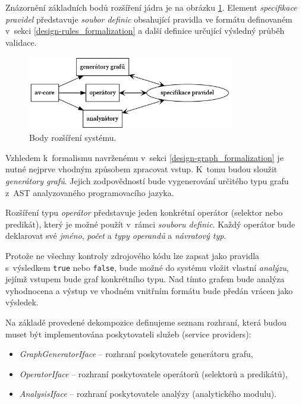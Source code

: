 Znázornění základních bodů rozšíření jádra je na obrázku \ref{design-system_extensions}. Element \emph{specifikace pravidel} představuje \emph{soubor definic} obsahující pravidla ve formátu definovaném v~sekci \ref{design-rules_formalization} a další definice určující výsledný průběh validace.

\begin{figure}[h!]
  \centering
  \includegraphics[width=0.8\textwidth]{./graphs/system_extensions.png}
  \caption{Body rozšíření systému.\label{design-system_extensions}}
\end{figure}

Vzhledem k~formalismu navrženému v~sekci \ref{design-graph_formalization} je nutné nejprve vhodným způsobem zpracovat vstup. K~tomu budou sloužit \emph{generátory grafů}. Jejich zodpovědností bude vygenerování určitého typu grafu z~AST analyzovaného programovacího jazyka.

Rozšíření typu \emph{operátor} představuje jeden konkrétní operátor (selektor nebo predikát), který je možné použít v~rámci \emph{souboru definic}. Každý operátor bude deklarovat své \emph{jméno}, \emph{počet} a \emph{typy operandů} a \emph{návratový typ}.

Protože ne všechny kontroly zdrojového kódu lze zapsat jako pravidla s~výsledkem \verb+true+ nebo \verb+false+, bude možné do systému vložit vlastní \emph{analýzu}, jejímž vstupem bude graf konkrétního typu. Nad tímto grafem bude analýza vyhodnocena a výstup ve vhodném vnitřním formátu bude předán vrácen jako výsledek.

Na základě provedené dekompozice definujeme seznam rozhraní, která budou muset být implementována poskytovateli služeb (service providers):

\begin{itemize}
\item \emph{GraphGeneratorIface} -- rozhraní poskytovatele generátoru grafu,
\item \emph{OperatorIface} -- rozhraní poskytovatele operátorů (selektorů a predikátů),
\item \emph{AnalysisIface} -- rozhraní poskytovatele analýzy (analytického modulu).
\end{itemize}


